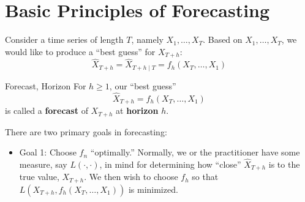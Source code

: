 \section{Basic Principles of Forecasting}
Consider a time series of length $ T $, namely $ X_1,\ldots,X_T $.
Based on $ X_1,\ldots,X_T $, we would like to produce a ``best guess''
for $ X_{T+h} $:
\[ \hat{X}_{T+h}=\hat{X}_{T+h\mid T}=f_h(X_T,\ldots,X_1) \]
\begin{Definition}{Forecast, Horizon}{}
    For $ h\ge 1 $, our ``best guess''
    \[ \hat{X}_{T+h}=f_h(X_T,\ldots,X_1) \]
    is called a \textbf{forecast} of $ X_{T+h} $
    at \textbf{horizon} $ h $.
\end{Definition}
There are two primary goals in forecasting:
\begin{itemize}
    \item Goal 1: Choose $ f_n $ ``optimally.'' Normally,
          we or the practitioner have some measure, say $ L(\cdot,\cdot) $,
          in mind for determining how ``close'' $ \hat{X}_{T+h} $
          is to the true value, $ X_{T+h} $. We then wish to choose $ f_h $ so that
          $ L(X_{T+h},f_h(X_T,\ldots,X_1)) $
          is minimized.


\end{itemize}
